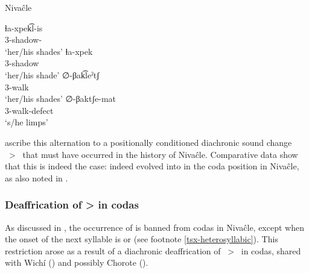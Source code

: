 \ea\label{ex:delateralization:niv}
Nivaĉle \citep[225–226]{AnG15}\\
    \begin{xlist}
        \ex\gll ɬa-xpek͡l-is\\
                3-shadow-\PL\\
                \glt `her/his shades'
        \ex\gll ɬa-xpek\\
                3-shadow\\
                \glt `her/his shade'
        \ex\gll ∅-βak͡leˀtʃ\\
                3-walk\\
                \glt `her/his shades'
        \ex\gll ∅-βaktʃe-mat\\
                3-walk-defect\\
                \glt `s/he limps'
    \end{xlist}
\z

\citet[8–9]{LC-VG-07} ascribe this alternation to a positionally conditioned diachronic sound change ~>~ that must have occurred in the history of Nivaĉle. Comparative data show that this is indeed the case:  indeed evolved into  in the coda position in Nivaĉle, as also noted in \citet[253]{AnG15}.

\begin{exe}
    \ex \returnth
    \ex \pll
    \ex \tell
    \ex \returnh
    \ex \shadow
    \ex \orphanmn
    \ex \chaguara
\end{exe}

\subsubsection{Deaffrication of  >  in codas}\label{ni-ts-s}

As discussed in , the occurrence of  is banned from codas in Nivaĉle, except when the onset of the next syllable is  or  (see footnote \ref{tsx-heterosyllabic}). This restriction arose as a result of a diachronic deaffrication of ~>~ in codas, shared with Wichí () and possibly Chorote ().

\begin{exe}
    \ex \rootn
    \ex \dew
    \ex \offspring
    \ex \trunk
    \ex \starn
    \ex \knee
\end{exe}

